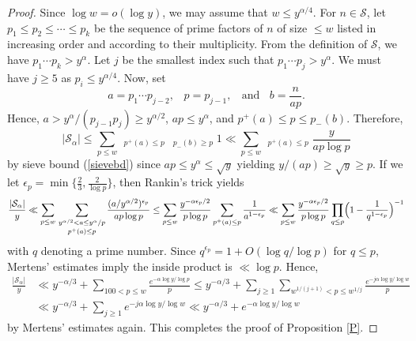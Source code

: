 \documentclass[10pt,a4paper]{amsart}
\begin{document}
\begin{proof}
Since $\log w = o (\log y)$, we may assume that $w \le y^{\alpha / 4}$. For $n \in \mathcal{S}$, let $p_1 \le p_2 \le \cdots \le p_k$ be the sequence of prime factors of $n$ of size $\le w$ listed in increasing order and according to their multiplicity. From the definition of $\mathcal{S}$, we have $p_1 \cdots p_k > y^\alpha$. Let $j$ be the smallest index such that $p_1 \cdots p_j > y^\alpha$. We must have $j \ge 5$ as $p_i \le y^{\alpha / 4}$. Now, set
\[
a = p_1 \cdots p_{j-2}, \; \; \; p = p_{j-1}, \; \; \text{ and } \; \; b = \frac{n}{a p}.
\]
Hence, $a > y^\alpha /(p_{j-1} p_j) \ge y^{\alpha / 2}$, $a p \le y^\alpha$, and $p^+(a) \le p \le p_{-}(b)$. Therefore,
\begin{equation} \label{Scount}
| \mathcal{S}_\alpha | \le \sum_{p \le w} \, \mathop{\sum_{y^{\alpha / 2} < a \le y^\alpha / p}}_{p^+(a) \le p} \, \mathop{\sum_{x/(ap) < b \le (x + y) /(a p)}}_{p_{-}(b) \ge p} 1 \ll \sum_{p \le w} \, \mathop{\sum_{y^{\alpha / 2} < a \le y^\alpha / p}}_{p^+(a) \le p} \frac{y}{a p \log p}
\end{equation}
by sieve bound (\ref{sievebd}) since $a p \le y^{\alpha} \le \sqrt{y}$ yielding $y / (a p) \ge \sqrt{y} \ge p$. If we let $\epsilon_p = \min \{ \frac{2}{3}, \frac{2}{\log p} \}$, then Rankin's trick yields
\[
\frac{| \mathcal{S}_\alpha |}{y} \ll \sum_{p \le w} \, \mathop{\sum_{y^{\alpha / 2} < a \le y^\alpha / p}}_{p^+(a) \le p} \frac{(a / y^{\alpha / 2})^{\epsilon_p}}{a p \log p} \le \sum_{p \le w} \frac{y^{- \alpha \epsilon_p / 2}}{p \log p} \sum_{p^+(a) \le p} \frac{1}{a^{1 - \epsilon_p}} \ll \sum_{p \le w} \frac{y^{- \alpha \epsilon_p / 2}}{p \log p} \prod_{q \le p} \Bigl(1 - \frac{1}{q^{1 - \epsilon_p}} \Bigr)^{-1}
\]
with $q$ denoting a prime number. Since $q^{\epsilon_p} = 1 + O(\log q / \log p)$ for $q \le p$, Mertens' estimates imply the inside product is $\ll \log p$. Hence,
\begin{align*}
\frac{| \mathcal{S}_\alpha |}{y} &\ll y^{- \alpha / 3} + \sum_{100 < p \le w} \frac{e^{- \alpha \log y / \log p}}{p} \le y^{- \alpha / 3} + \sum_{j \ge 1} \sum_{w^{1 / (j+1)} < p \le w^{1 / j}} \frac{e^{- j \alpha \log y / \log w}}{p} \\
&\ll y^{-\alpha / 3} + \sum_{j \ge 1} e^{- j \alpha \log y / \log w} \ll y^{-\alpha / 3} + e^{- \alpha \log y / \log w}
\end{align*}
by Mertens' estimates again. This completes the proof of Proposition \ref{P}.
\end{proof}
\end{document}
